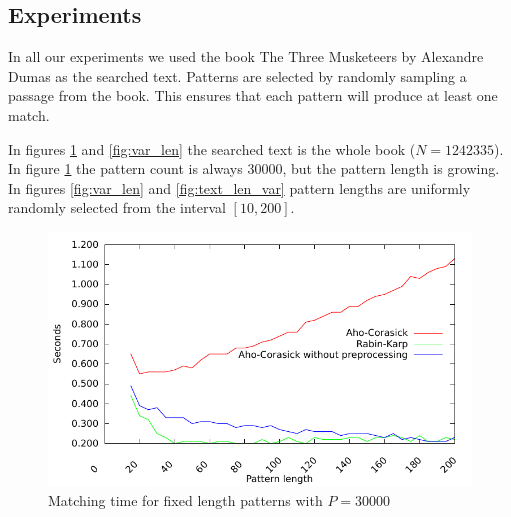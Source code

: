 \documentclass[final]{beamer}
\begin{document}
\begin{poster}
\section{Experiments}
In all our experiments we used the book The Three Musketeers by Alexandre Dumas as the
searched text.
Patterns are selected by randomly sampling a passage from the book.
This ensures that each pattern will produce at least one match.

In figures \ref{fig:fixed_len} and \ref{fig:var_len} the searched text is the whole book ($N=1242335$).
In figure \ref{fig:fixed_len} the pattern count is always 30000, but the pattern length is
growing.
In figures \ref{fig:var_len} and \ref{fig:text_len_var} pattern lengths are uniformly randomly selected from the interval $[10,200]$.

\begin{figure}
\centering
 \includegraphics[width=25cm]{fixed_len.pdf}
\caption{Matching time for fixed length patterns with $P=30000$}
\label{fig:fixed_len}
\end{figure}
\newcolumn


\end{poster}
\end{document}
